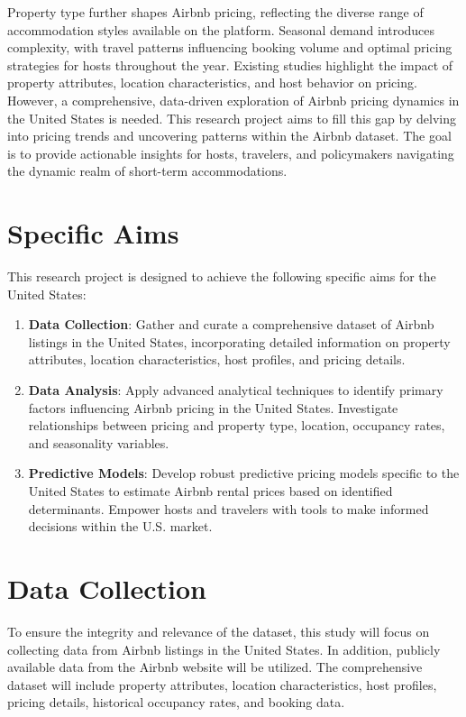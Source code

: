 \documentclass[12pt, letterpaper]{article}
\begin{document}
Property type further shapes Airbnb pricing, reflecting the diverse range of accommodation styles available on the platform. Seasonal demand introduces complexity, with travel patterns influencing booking volume and optimal pricing strategies for hosts throughout the year. Existing studies highlight the impact of property attributes, location characteristics, and host behavior on pricing. However, a comprehensive, data-driven exploration of Airbnb pricing dynamics in the United States is needed. This research project aims to fill this gap by delving into pricing trends and uncovering patterns within the Airbnb dataset. The goal is to provide actionable insights for hosts, travelers, and policymakers navigating the dynamic realm of short-term accommodations.

\section*{Specific Aims}
This research project is designed to achieve the following specific aims for the United States:

\begin{enumerate}
  \item \textbf{Data Collection}: Gather and curate a comprehensive dataset of Airbnb listings in the United States, incorporating detailed information on property attributes, location characteristics, host profiles, and pricing details.
  \item \textbf{Data Analysis}: Apply advanced analytical techniques to identify primary factors influencing Airbnb pricing in the United States. Investigate relationships between pricing and property type, location, occupancy rates, and seasonality variables.
  \item \textbf{Predictive Models}: Develop robust predictive pricing models specific to the United States to estimate Airbnb rental prices based on identified determinants. Empower hosts and travelers with tools to make informed decisions within the U.S. market.
\end{enumerate}

\section*{Data Collection}
To ensure the integrity and relevance of the dataset, this study will focus on collecting data from Airbnb listings in the United States. In addition, publicly available data from the Airbnb website will be utilized. The comprehensive dataset will include property attributes, location characteristics, host profiles, pricing details, historical occupancy rates, and booking data.
\end{document}
